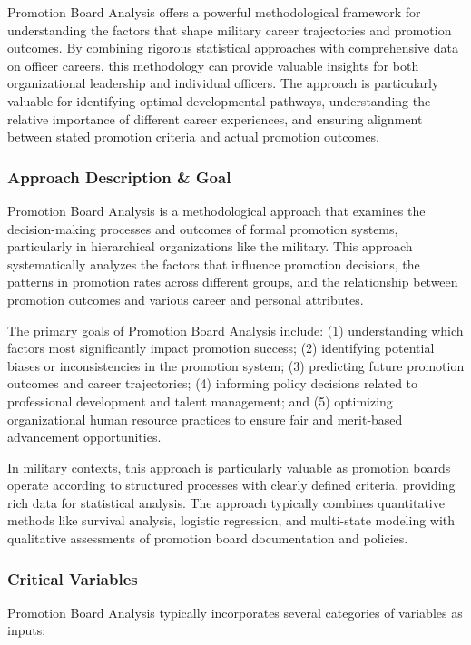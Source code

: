\documentclass[../main.tex]{subfiles}
\begin{document}
Promotion Board Analysis offers a powerful methodological framework for understanding the factors that shape military career trajectories and promotion outcomes. By combining rigorous statistical approaches with comprehensive data on officer careers, this methodology can provide valuable insights for both organizational leadership and individual officers. The approach is particularly valuable for identifying optimal developmental pathways, understanding the relative importance of different career experiences, and ensuring alignment between stated promotion criteria and actual promotion outcomes.

\subsubsection{Approach Description \& Goal}

Promotion Board Analysis is a methodological approach that examines the decision-making processes and outcomes of formal promotion systems, particularly in hierarchical organizations like the military. This approach systematically analyzes the factors that influence promotion decisions, the patterns in promotion rates across different groups, and the relationship between promotion outcomes and various career and personal attributes.

The primary goals of Promotion Board Analysis include: (1) understanding which factors most significantly impact promotion success; (2) identifying potential biases or inconsistencies in the promotion system; (3) predicting future promotion outcomes and career trajectories; (4) informing policy decisions related to professional development and talent management; and (5) optimizing organizational human resource practices to ensure fair and merit-based advancement opportunities.

In military contexts, this approach is particularly valuable as promotion boards operate according to structured processes with clearly defined criteria, providing rich data for statistical analysis. The approach typically combines quantitative methods like survival analysis, logistic regression, and multi-state modeling with qualitative assessments of promotion board documentation and policies.

\subsubsection{Critical Variables}

Promotion Board Analysis typically incorporates several categories of variables as inputs:
\end{document}
